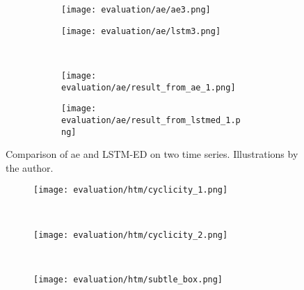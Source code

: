 \begin{figure}[htp!]
    \begin{subfigure}[b]{\linewidth}
        \begin{subfigure}[b]{.45\linewidth}
            \centering
            \texttt{[image: evaluation/ae/ae3.png]}
        \end{subfigure}
        \hfill
        \begin{subfigure}[b]{.45\linewidth}
            \centering
            \texttt{[image: evaluation/ae/lstm3.png]}
        \end{subfigure}
        \label{fig:lstm-vs-ae1}
    \end{subfigure}
    \\
    \begin{subfigure}[b]{\linewidth}
        \begin{subfigure}[b]{.45\linewidth}
            \centering
            \texttt{[image: evaluation/ae/result\_from\_ae\_1.png]}
        \end{subfigure}
        \hfill
        \begin{subfigure}[b]{.45\linewidth}
            \centering
            \texttt{[image: evaluation/ae/result\_from\_lstmed\_1.png]}
        \end{subfigure}
        \label{fig:lstm-vs-ae2}
    \end{subfigure}
\caption[Comparison of \gls{ae} and LSTM-ED on two time series.]{Comparison of \gls{ae} and LSTM-ED on two time series. Illustrations by the author.}\label{fig:lstm-vs-ae}
\end{figure}

\begin{figure}[htp!]
    \begin{subfigure}[b]{\linewidth}
        \centering
        \texttt{[image: evaluation/htm/cyclicity\_1.png]}
        \label{fig:htm-cyclicity}
    \end{subfigure}%
    \\
    \begin{subfigure}[b]{\linewidth}
        \centering
        \texttt{[image: evaluation/htm/cyclicity\_2.png]}
        \label{fig:htm-cyclicity2}
    \end{subfigure}%
    \\
    \begin{subfigure}[b]{\linewidth}
        \centering
        \texttt{[image: evaluation/htm/subtle\_box.png]}
        \label{fig:htm-subtle}
    \end{subfigure}
\end{figure}

